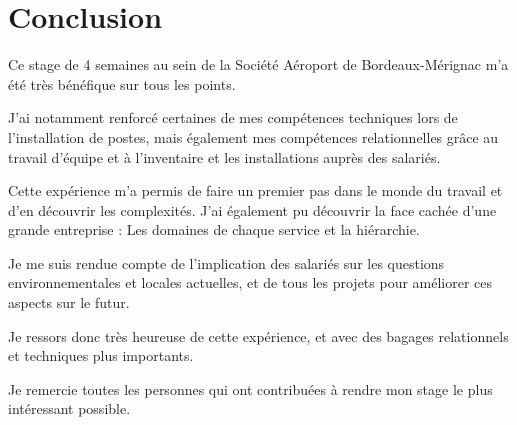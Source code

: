 \chapter{Conclusion}


Ce stage de 4 semaines au sein de la Société Aéroport de Bordeaux-Mérignac m’a été très bénéfique sur tous les points.

J’ai notamment renforcé certaines de mes compétences techniques lors de l’installation de postes, mais également mes compétences relationnelles grâce au travail d’équipe et à l’inventaire et les installations auprès des salariés.

Cette expérience m’a permis de faire un premier pas dans le monde du travail et d’en découvrir les complexités. J’ai également pu découvrir la face cachée d’une grande entreprise : Les domaines de chaque service et la hiérarchie.

Je me suis rendue compte de l’implication des salariés sur les questions environnementales et locales actuelles, et de tous les projets pour améliorer ces aspects sur le futur.

Je ressors donc très heureuse de cette expérience, et avec des bagages relationnels et techniques plus importants.

Je remercie toutes les personnes qui ont contribuées à rendre mon stage le plus intéressant possible.